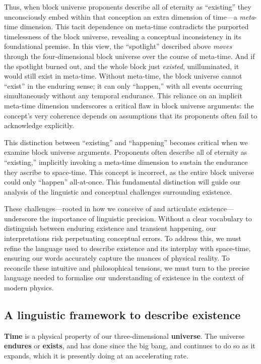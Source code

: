 \documentclass[aps,rmp,groupedaddress,twocolumn,10pt]{revtex4-2}
\begin{document}
Thus, when block universe proponents describe all of eternity as ``existing'' they unconsciously embed within that conception an extra dimension of time---a \textit{meta}-time dimension. This tacit dependence on meta-time contradicts the purported timelessness of the block universe, revealing a conceptual inconsistency in its foundational premise. In this view, the ``spotlight'' described above \textit{moves} through the four-dimensional block universe over the course of meta-time. And if the spotlight burned out, and the whole block just \textit{existed}, unilluminated, it would still exist in meta-time. Without meta-time, the block universe cannot ``exist'' in the enduring sense; it can only ``happen,'' with all events occurring simultaneously without any temporal endurance. This reliance on an implicit meta-time dimension underscores a critical flaw in block universe arguments: the concept's very coherence depends on assumptions that its proponents often fail to acknowledge explicitly.

This distinction between ``existing'' and ``happening'' becomes critical when we examine block universe arguments. Proponents often describe all of eternity as ``existing,'' implicitly invoking a meta-time dimension to sustain the endurance they ascribe to space-time. This concept is incorrect, as the entire block universe could only ``happen'' all-at-once. This fundamental distinction will guide our analysis of the linguistic and conceptual challenges surrounding existence.

These challenges---rooted in how we conceive of and articulate existence---underscore the importance of linguistic precision. Without a clear vocabulary to distinguish between enduring existence and transient happening, our interpretations risk perpetuating conceptual errors. To address this, we must refine the language used to describe existence and its interplay with space-time, ensuring our words accurately capture the nuances of physical reality. To reconcile these intuitive and philosophical tensions, we must turn to the precise language needed to formalise our understanding of existence in the context of modern physics.

\subsection{A linguistic framework to describe existence}

\textbf{Time} is a physical property of our three-dimensional \textbf{universe}. The universe \textbf{endures} or \textbf{exists}, and has done since the big bang, and continues to do so as it expands, which it is presently doing at an accelerating rate. 
\end{document}
